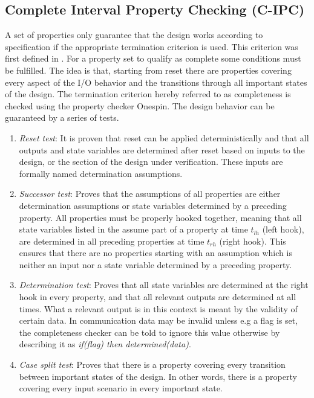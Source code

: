 \subsection{Complete Interval Property Checking (C-IPC)}
\label{sub:cipc}
A set of properties only guarantee that the design works according to specification if the appropriate termination criterion is used. This criterion was first defined in \cite{bormannbusch}. For a property set to qualify as complete some conditions must be fulfilled. The idea is that, starting from reset there are properties covering every aspect of the I/O behavior and the transitions through all important states of the design. The termination criterion hereby referred to as completeness is checked using the property checker Onespin. The design behavior can be guaranteed by a series of tests.
\begin{enumerate}
 \item \textit{Reset test}: It is proven that reset can be applied deterministically and that all outputs and state variables are determined after reset based on inputs to the design, or the section of the design under verification. These inputs are formally named determination assumptions.  
 \item \textit{Successor test}: Proves that the assumptions of all properties are either determination assumptions or state variables determined by a preceding property. All properties must be properly hooked together, meaning that all state variables listed in the assume part of a property at time $t_{lh}$ (left hook), are determined in all preceding properties at time $t_{rh}$ (right hook). This ensures that there are no properties starting with an assumption which is neither an input nor a state variable determined by a preceding property.
 \item \textit{Determination test}: Proves that all state variables are determined at the right hook in every property, and that all relevant outputs are determined at all times. What a relevant output is in this context is meant by the validity of certain data. In communication data may be invalid unless e.g a flag is set, the completeness checker can be told to ignore this value otherwise by describing it as \textit{if(flag) then determined(data)}.
 \item \textit{Case split test}: Proves that there is a property covering every transition between important states of the design. In other words, there is a property covering every input scenario in every important state. 
\end{enumerate}

